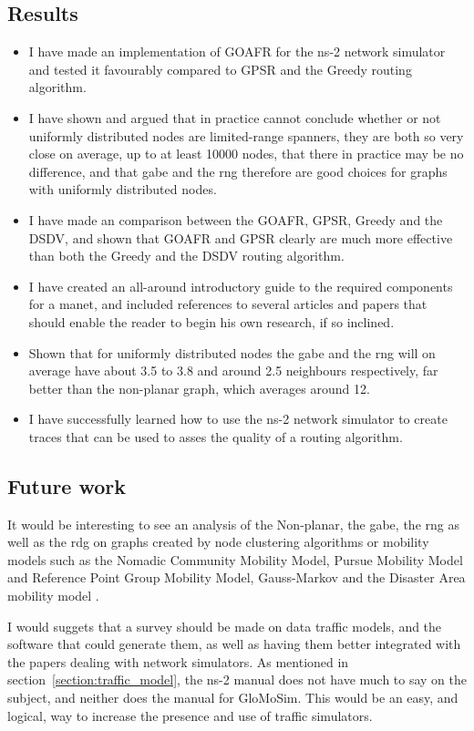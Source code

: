 \subsection{Results}
\begin{itemize}
\item I have made an implementation of GOAFR for the ns-2 network simulator and tested it favourably compared to GPSR and the Greedy routing algorithm.
\item I have shown and argued that in practice cannot conclude whether or not uniformly distributed nodes are limited-range spanners, they are both so very close on average, up to at least 10000 nodes, that there in practice may be no difference, and that \ac{gabe} and the \ac{rng} therefore are good choices for graphs with uniformly distributed nodes.
\item I have made an comparison between the GOAFR, GPSR, Greedy and the DSDV, and shown that GOAFR  and GPSR clearly are much more effective than both the Greedy and the DSDV routing algorithm.
\item I have created an all-around introductory guide to the required components for a \ac{manet}, and included references to several articles and papers that should enable the reader to begin his own research, if so inclined.
\item Shown that for uniformly distributed nodes the \ac{gabe} and the \ac{rng} will on average have about 3.5 to 3.8 and around 2.5 neighbours respectively, far better than the non-planar graph, which averages around 12.
\item I have successfully learned how to use the ns-2 network simulator to create traces that can be used to asses the quality of a routing algorithm.
\end{itemize}

\subsection{Future work}
\label{section:future_work}
It would be interesting to see an analysis of the Non-planar, the \ac{gabe}, the \ac{rng} as well as the \ac{rdg} on graphs created by node clustering algorithms or mobility models such as the Nomadic Community Mobility Model, Pursue Mobility Model and Reference Point Group Mobility Model, Gauss-Markov \cite{MobilityAdHocResearch} and the Disaster Area mobility model \cite{disasterArea}.

I would suggets that a survey should be made on data traffic models, and the software that could generate them, as well as having them better integrated with the papers dealing with network simulators. As mentioned in section~\ref{section:traffic_model}, the ns-2 manual does not have much to say on the subject, and neither does the manual for GloMoSim. This would be an easy, and logical, way to increase the presence and use of traffic simulators.

